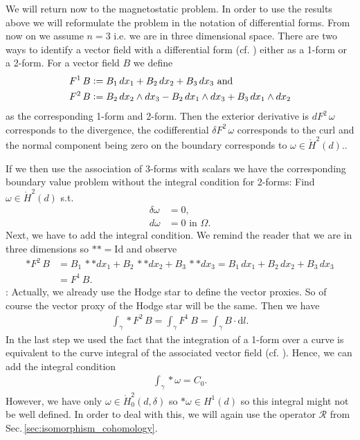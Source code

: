 \documentclass[12pt,a4paper]{article}
\numberwithin{equation}{subsection}
\numberwithin{lemma}{subsection}
\theoremstyle{definition}
\newcommand{\rop}{\mathscr{R}} %
\begin{document}
We will return now to the magnetostatic problem. In order to use the results
above we will reformulate the problem in the notation of differential forms.
From now on we assume $n=3$ i.e. we are in three dimensional space.
There are two ways to identify a vector field with a differential form 
(cf. \cite[Table 6.1 and p.70]{arnold}) either as a 1-form or a 2-form. 
For a vector field $B$ we define
\begin{align*}
    F^1\, B &\vcentcolon= B_1 \, dx_1 + B_2 \, dx_2 + B_3\, dx_3 \text{ and}\\
    F^2\, B &\vcentcolon= B_2 \, dx_2 \wedge dx_3 - B_2 \, dx_1 \wedge dx_3
        + B_3 \, dx_1 \wedge dx_2
\end{align*} 
as the corresponding 1-form and 2-form. 
Then the exterior derivative is $dF^2\,\omega$ corresponds to the divergence,
the codifferential $\delta F^2\,\omega$ 
corresponds to the curl and the normal component
being zero on the boundary corresponds 
to $\omega \in \mathring{H}^2(d)$.\cite{}. 

If we then use the association of
3-forms with scalars we have the corresponding boundary value problem without
the integral condition for 
2-forms: Find $\omega \in \mathring{H}^2(d)$ s.t.
\begin{align}
    \delta \omega &= 0, \\ 
    d\omega  &= 0 \text{ in } \Omega.
\end{align}
Next, we have to add the integral condition. 
We remind the reader that we are in three dimensions so
$**= \text{Id}$ 
and observe
\begin{align*}
    *F^2 \, B  &= B_1 \, **dx_1 + B_2 \, **dx_2 + B_3\, **dx_3 
        = B_1 \, dx_1 + B_2 \, dx_2 + B_3\, dx_3\\ 
    &= F^1 \, B.
\end{align*}
{\color{red}: Actually, we already use the Hodge star to define the vector 
proxies. So of course the vector proxy of the Hodge star will be the same.}
Then we have 
\begin{align*}
    \int_\gamma * F^2\, B = \int_\gamma F   ^1\, B = \int_\gamma B \cdot \text{d}l.
\end{align*}
In the last step we used the fact that the integration of a 1-form over a
curve is equivalent to the curve integral of the associated vector field
(cf. \cite[Sec. 6.2.3]{arnold}). Hence, we can add the integral condition 
\begin{align}
    \int_\gamma *\omega = C_0 \label{integral_condition}.
\end{align}
However, we have  only $\omega \in \mathring{H}_0^2(d,\delta)$ so 
$*\omega \in H^1(d)$ so this integral might not be well defined. In order 
to deal with this, we will again use the operator $\rop$ from 
Sec.\,\ref{sec:isomorphism_cohomology}. 
\end{document}
